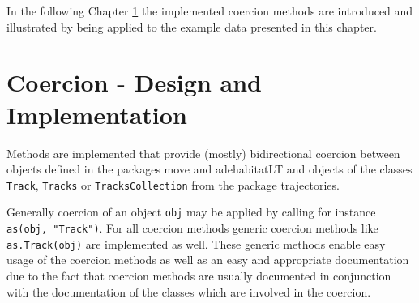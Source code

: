 \documentclass[12pt, oneside, a4paper]{scrbook}
\newcommand{\pkg}[1]{{\normalfont\fontseries{b}\selectfont #1}}
\let\code=\texttt
\begin{document}

% 
% 


In the following Chapter \ref{chap:coercion} the implemented coercion methods are introduced and illustrated by being applied to the example data presented in this chapter.



%
%
\chapter{Coercion - Design and Implementation}
\label{chap:coercion}

Methods are implemented that provide (mostly) bidirectional coercion between objects defined in the packages \pkg{move} and \pkg{adehabitatLT} and objects of the classes \code{Track}, \code{Tracks} or \code{TracksCollection} from the package \pkg{trajectories}.
\par\medskip

Generally coercion of an object \code{obj} may be applied by calling for instance \code{as(obj, "Track")}.
For all coercion methods generic coercion methods like \code{as.Track(obj)} are implemented as well. These generic methods enable easy usage of the coercion methods as well as an easy and appropriate documentation due to the fact that coercion methods are usually documented in conjunction with the documentation of the classes which are involved in the coercion.
\par\medskip
\end{document}
